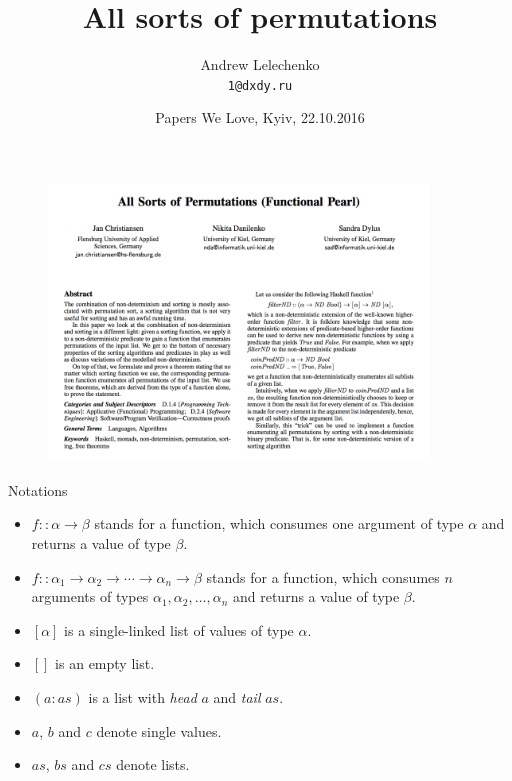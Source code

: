\documentclass[handout]{beamer}
\title{All sorts of permutations}
\author[Andrew Lelechenko]{Andrew Lelechenko \\ \texttt{1@dxdy.ru}}
\date{Papers We Love, Kyiv, 22.10.2016}
\begin{document}
\begin{frame}
  \titlepage
\end{frame}

\begin{frame}
\begin{figure}[H]
\centering
\includegraphics[width=0.9\textwidth]{paper.png}
\end{figure}
\end{frame}

\begin{frame}{Notations}
\begin{itemize}

\item $f :: \alpha \to \beta$ stands for a function, which consumes one argument of type $\alpha$ and returns a value of type $\beta$.

\item $f :: \alpha_1 \to \alpha_2 \to \cdots \to \alpha_n \to \beta$ stands for a function, which consumes $n$ arguments of types $\alpha_1, \alpha_2, \ldots, \alpha_n$ and returns a value of type $\beta$.

\item $[\alpha]$ is a single-linked list of values of type $\alpha$.

\item $[]$ is an empty list.

\item $(a : as)$ is a list with {\em head} $a$ and {\em tail} $as$.

\item $a$, $b$ and $c$ denote single values.

\item $as$, $bs$ and $cs$ denote lists.

\end{itemize}
\end{frame}
\end{document}
